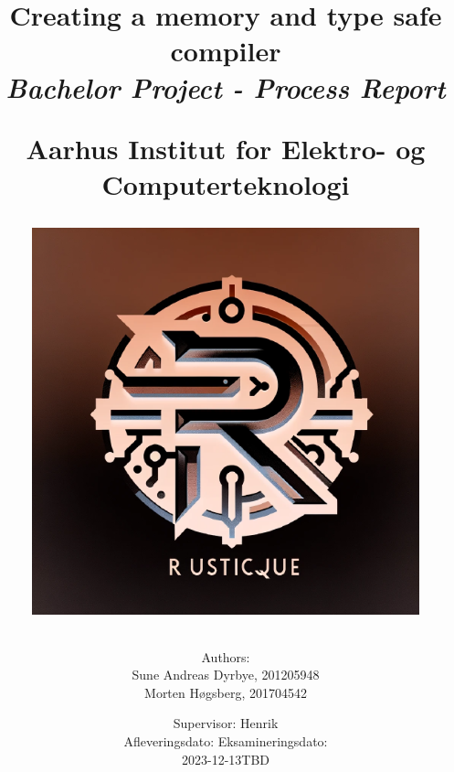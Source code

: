 \newcommand{\authorName}{}
\newcommand{\titleName}{Creating a memory and type safe compiler}
\newcommand{\subject}{Bachelor Project - Process Report}
\newcommand{\vejleder}{Supervisor: Henrik}
\newcommand{\institute}{Aarhus Institut for Elektro- og Computerteknologi}
\begin{titlepage}
  \centering
    \title
    {
      \Huge \textbf{\titleName}\\
      \scale{\numberSQRTTWO}{\vspace{\sol pt}}
      \LARGE \textit{\subject}
      \scale{\numberSQRTTWO}{\rule{\linewidth}{\sol pt}}

      \textbf{\institute}

      \begin{figure}[h]
        \centering
        \includegraphics[scale=0.5]{02-Body/Images/rusticqueLogo.png}
      \end{figure}

      \author
    {
      \LARGE Authors: \\
      Sune Andreas Dyrbye, 201205948 \\
      Morten Høgsberg, 201704542 \\
      }
           \date{
        \Large \vejleder \\
        \vspace{1em}
        Afleveringsdato: \hfill
        Eksamineringsdato:\\
        2023-12-13\hfill TBD
      }


    }
   
\end{titlepage}
